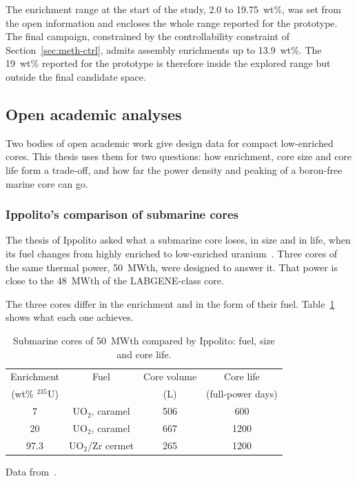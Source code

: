 The enrichment range at the start of the study, 2.0 to 19.75~wt\%, was
set from the open information and encloses the whole range reported for
the prototype. The
final campaign, constrained by the controllability constraint of
Section~\ref{sec:meth-ctrl}, admits assembly enrichments up to
13.9~wt\%. The 19~wt\% reported for the prototype is therefore inside
the explored range but outside the final candidate space.

\subsection{Open academic analyses}
\label{subsec:naval-academic}

Two bodies of open academic work give design data for compact
low-enriched cores. This thesis uses them for two questions: how
enrichment, core size and core life form a trade-off, and how
far the power density and peaking of a boron-free marine core can go.

\subsubsection{Ippolito's comparison of submarine cores}
\label{subsec:academic-ippolito}

The thesis of Ippolito asked what a submarine core loses, in size and
in life, when its fuel changes from highly enriched to low-enriched
uranium~\cite{ippolito_1990}. Three cores of the same thermal power,
50~MWth, were designed to answer it. That power is close to the
48~MWth of the LABGENE-class core.

The three cores differ in the enrichment and in the form of their fuel.
Table~\ref{tab:lr-ippolito} shows what each one achieves.

\begin{table}[!htbp]
  \centering
  \caption{Submarine cores of 50~MWth compared by Ippolito: fuel, size and core life.}
  \label{tab:lr-ippolito}
  \small
  \begin{tabular}{@{}cccc@{}}
    \toprule
    Enrichment & Fuel & Core volume & Core life \\
    (wt\% $^{235}$U) & & (L) & (full-power days) \\
    \midrule
    7    & UO$_2$, caramel   & 506 & 600  \\
    20   & UO$_2$, caramel   & 667 & 1200 \\
    97.3 & UO$_2$/Zr cermet  & 265 & 1200 \\
    \bottomrule
  \end{tabular}

  \vspace{2pt}
  {\footnotesize Data from~\cite{ippolito_1990}.}
\end{table}
\FloatBarrier

